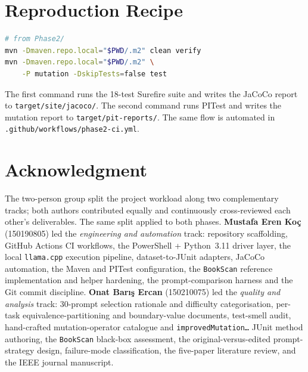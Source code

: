 \documentclass[journal]{IEEEtran}
\begin{document}
\section{Reproduction Recipe}\label{app:repro}

\begin{lstlisting}[language=bash, caption=Reproducing the Phase 2 BookScan build and PITest report.]
# from Phase2/
mvn -Dmaven.repo.local="$PWD/.m2" clean verify
mvn -Dmaven.repo.local="$PWD/.m2" \
    -P mutation -DskipTests=false test
\end{lstlisting}

The first command runs the 18-test Surefire suite and writes the JaCoCo
report to \texttt{target/site/jacoco/}. The second command runs PITest
and writes the mutation report to \texttt{target/pit-reports/}. The same
flow is automated in \texttt{.github/workflows/phase2-ci.yml}.

\section*{Acknowledgment}

The two-person group split the project workload along two complementary
tracks; both authors contributed equally and continuously cross-reviewed
each other's deliverables. The same split applied to both phases.
\textbf{Mustafa Eren Ko\c{c}} (150190805) led the \emph{engineering and
automation} track: repository scaffolding, GitHub Actions CI workflows,
the PowerShell + Python~3.11 driver layer, the local \texttt{llama.cpp}
execution pipeline, dataset-to-JUnit adapters, JaCoCo automation, the
Maven and PITest configuration, the \texttt{BookScan} reference
implementation and helper hardening, the prompt-comparison harness and
the Git commit discipline. \textbf{Onat Bar{\i}\c{s} Ercan} (150210075)
led the \emph{quality and analysis} track: 30-prompt selection rationale
and difficulty categorisation, per-task equivalence-partitioning and
boundary-value documents, test-smell audit, hand-crafted mutation-operator
catalogue and \texttt{improvedMutation\ldots} JUnit method authoring, the
\texttt{BookScan} black-box assessment, the original-versus-edited
prompt-strategy design, failure-mode classification, the five-paper
literature review, and the IEEE journal manuscript.
\end{document}
